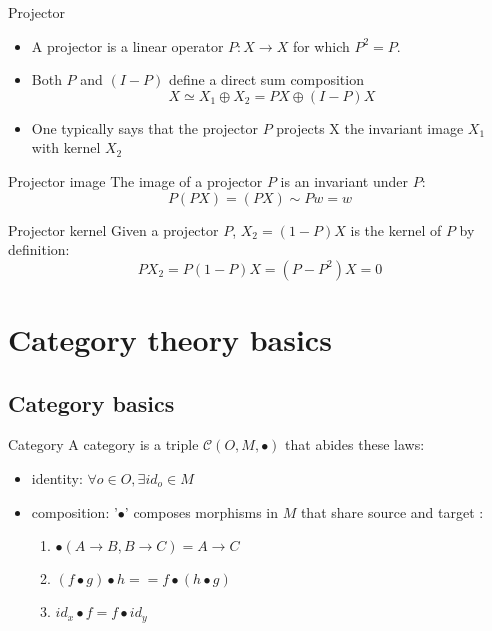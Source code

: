 \documentclass[presentation]{beamer}
\begin{document}
\begin{frame}[label={sec:org235637d}]{Projector}
\begin{itemize}
\item A \alert{projector} is a linear operator \(P: X \rightarrow X\) for which \(P^2=P\).

\item Both \(P\) and \((I-P)\) define a direct sum composition $$X \simeq X_1 \oplus X_2 = PX \oplus (I-P)X$$

\item One typically says that \alert{the projector \(P\) projects X the invariant image \(X_1\) with kernel \(X_2\)}
\end{itemize}
\end{frame}

\begin{frame}[label={sec:org55e3ee5}]{Projector image}
The image of a projector \(P\) is an \alert{invariant} under \(P\): $$ P(PX)=(PX) \sim Pw=w$$
\end{frame}


\begin{frame}[label={sec:orga489e38}]{Projector kernel}
Given a projector \(P\), \(X_2 = (1-P)X\) is the kernel of \(P\) by definition: $$PX_2 = P(1-P)X = (P-P^2)X = 0$$
\end{frame}




\section{Category theory basics}
\label{sec:orgdfa8141}

\subsection{Category basics}
\label{sec:org3818826}
\begin{frame}[label={sec:orga329c8c}]{Category}
A category is a triple \(\mathcal{C}(O, M, \bullet)\) that abides these laws:

\begin{itemize}
\item \alert{identity}: \(\forall o \in O, \exists id_o \in M\)

\item \alert{composition}: '\(\bullet\)' composes morphisms in \(M\) that share source and target :

\begin{enumerate}
\item \(\bullet(A \rightarrow B, B \rightarrow C) = A \rightarrow C\)

\item \((f \bullet g) \bullet h == f \bullet (h \bullet g)\)

\item \(id_x \bullet f = f \bullet id_y\)
\end{enumerate}
\end{itemize}
\end{frame}
\end{document}
